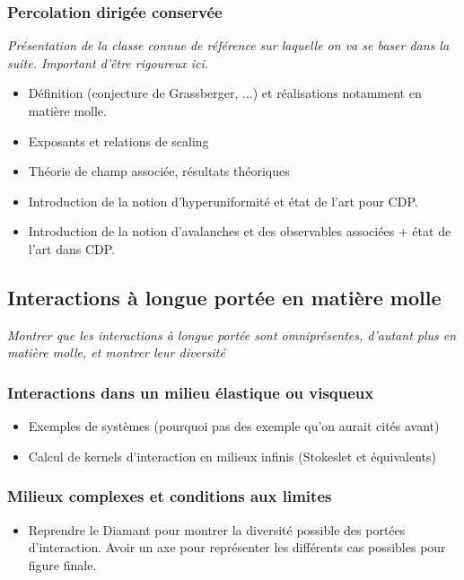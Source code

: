 \documentclass[10pt,a4paper]{article}
\begin{document}
\subsubsection{Percolation dirigée conservée}

\textit{Présentation de la classe connue de référence sur laquelle on va se baser dans la suite. Important d'être rigoureux ici.}

\begin{itemize}
	\item Définition (conjecture de Grassberger, ...) et réalisations notamment en matière molle.
	\item Exposants et relations de scaling
	\item Théorie de champ associée, résultats théoriques
	\item Introduction de la notion d'hyperuniformité et état de l'art pour CDP.
	\item Introduction de la notion d'avalanches et des observables associées + état de l'art dans CDP.
\end{itemize}

\subsection{Interactions à longue portée en matière molle}

\textit{Montrer que les interactions à longue portée sont omniprésentes, d'autant plus en matière molle, et montrer leur diversité}

\subsubsection{Interactions dans un milieu élastique ou visqueux}

\begin{itemize}
	\item Exemples de systèmes (pourquoi pas des exemple qu'on aurait cités avant)
	\item Calcul de kernels d'interaction en milieux infinis (Stokeslet et équivalents)
\end{itemize}

\subsubsection{Milieux complexes et conditions aux limites}

\begin{itemize}
	\item Reprendre le Diamant pour montrer la diversité possible des portées d'interaction. Avoir un axe pour représenter les différents cas possibles pour figure finale.
\end{itemize}
\end{document}
